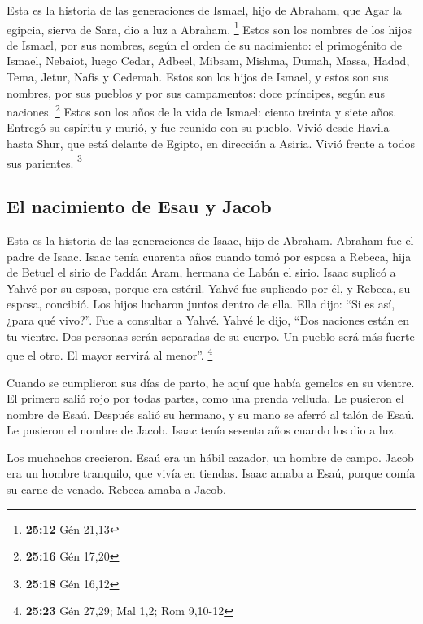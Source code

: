 \begin{paracol}{2}
 Esta es la historia de las generaciones de Ismael, hijo
de Abraham, que Agar la egipcia, sierva de Sara, dio a luz a Abraham.
\footnote{\textbf{25:12} Gén 21,13}  Estos son los
nombres de los hijos de Ismael, por sus nombres, según el orden de su
nacimiento: el primogénito de Ismael, Nebaiot, luego Cedar, Adbeel,
Mibsam,  Mishma, Dumah, Massa,  Hadad,
Tema, Jetur, Nafis y Cedemah.  Estos son los hijos de
Ismael, y estos son sus nombres, por sus pueblos y por sus campamentos:
doce príncipes, según sus naciones. \footnote{\textbf{25:16} Gén 17,20}
 Estos son los años de la vida de Ismael: ciento treinta
y siete años. Entregó su espíritu y murió, y fue reunido con su pueblo.
 Vivió desde Havila hasta Shur, que está delante de
Egipto, en dirección a Asiria. Vivió frente a todos sus parientes.
\footnote{\textbf{25:18} Gén 16,12}

\hypertarget{el-nacimiento-de-esau-y-jacob}{%
\subsection{El nacimiento de Esau y
Jacob}\label{el-nacimiento-de-esau-y-jacob}}

 Esta es la historia de las generaciones de Isaac, hijo
de Abraham. Abraham fue el padre de Isaac.  Isaac tenía
cuarenta años cuando tomó por esposa a Rebeca, hija de Betuel el sirio
de Paddán Aram, hermana de Labán el sirio.  Isaac suplicó
a Yahvé por su esposa, porque era estéril. Yahvé fue suplicado por él, y
Rebeca, su esposa, concibió.  Los hijos lucharon juntos
dentro de ella. Ella dijo: ``Si es así, ¿para qué vivo?''. Fue a
consultar a Yahvé.  Yahvé le dijo, ``Dos naciones están
en tu vientre. Dos personas serán separadas de su cuerpo. Un pueblo será
más fuerte que el otro. El mayor servirá al menor''. \footnote{\textbf{25:23}
  Gén 27,29; Mal 1,2; Rom 9,10-12}

 Cuando se cumplieron sus días de parto, he aquí que
había gemelos en su vientre.  El primero salió rojo por
todas partes, como una prenda velluda. Le pusieron el nombre de Esaú.
 Después salió su hermano, y su mano se aferró al talón
de Esaú. Le pusieron el nombre de Jacob. Isaac tenía sesenta años cuando
los dio a luz.

 Los muchachos crecieron. Esaú era un hábil cazador, un
hombre de campo. Jacob era un hombre tranquilo, que vivía en tiendas.
 Isaac amaba a Esaú, porque comía su carne de venado.
Rebeca amaba a Jacob.


\end{paracol}
